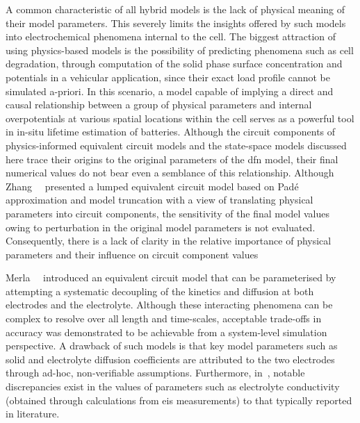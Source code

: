 A common characteristic of all hybrid models  is the lack of physical meaning of
their model parameters. This severely limits the insights offered by such models
into electrochemical phenomena  internal to the cell. The  biggest attraction of
using  physics-based models  is  the possibility  of  predicting phenomena  such
as  cell degradation,  \eg{}  through  computation of  the  solid phase  surface
concentration and potentials in a  vehicular application, since their exact load
profile  cannot be  simulated a-priori.  In this  scenario, a  model capable  of
implying a direct and causal relationship between a group of physical parameters
and internal overpotentials at various  spatial locations within the cell serves
as  a  powerful tool  in  in-situ  lifetime  estimation of  batteries.  Although
the  circuit  components  of  physics-informed  equivalent  circuit  models  and
the  state-space models  discussed  here  trace their  origins  to the  original
parameters of  the \gls{dfn}  model, their  final numerical  values do  not bear
even a  semblance of this relationship.  Although Zhang~\etal{}~\cite{Zhang2017}
presented a  lumped equivalent  circuit model based  on Padé  approximation and
model truncation  with a  view of translating  physical parameters  into circuit
components, the sensitivity  of the final model values owing  to perturbation in
the original model parameters is not evaluated. Consequently, there is a lack of
clarity in the relative importance of physical parameters and their influence on
circuit component values


Merla~\etal{}~\cite{Merla2018} introduced  an equivalent circuit model  that can
be  parameterised by  attempting a  systematic  decoupling of  the kinetics  and
diffusion at  both electrodes  and the  electrolyte. Although  these interacting
phenomena can be complex to resolve  over all length and time-scales, acceptable
trade-offs in  accuracy was  demonstrated to be  achievable from  a system-level
simulation perspective. A  drawback of such models is that  key model parameters
such  as  solid  and  electrolyte   diffusion  coefficients  are  attributed  to
the  two electrodes  through  ad-hoc,  non-verifiable assumptions.  Furthermore,
in~\cite{Merla2018},  notable discrepancies  exist in  the values  of parameters
such as  electrolyte conductivity (obtained through  calculations from \gls{eis}
measurements)  to that  typically reported  in literature.


